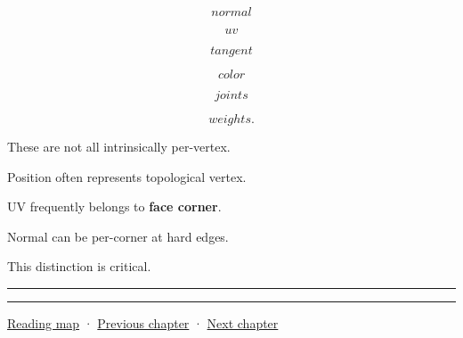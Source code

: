 \[
normal
\]

\[
uv
\]

\[
tangent
\]

\[
color
\]

\[
joints
\]

\[
weights.
\]

These are not all intrinsically per-vertex.

Position often represents topological vertex.

UV frequently belongs to \textbf{face corner}.

Normal can be per-corner at hard edges.

This distinction is critical.

\begin{center}\rule{0.5\linewidth}{0.5pt}\end{center}

\begin{center}\rule{0.5\linewidth}{0.5pt}\end{center}

\href{Chapter\%20Edition/02\%20-\%20Graphics\%20Vision\%20and\%20XR/00\%20-\%20Reading\%20Map}{Reading map} · \hyperref[04-visual-computing-ii-ch039]{Previous chapter} · \hyperref[04-visual-computing-ii-ch041]{Next chapter}
